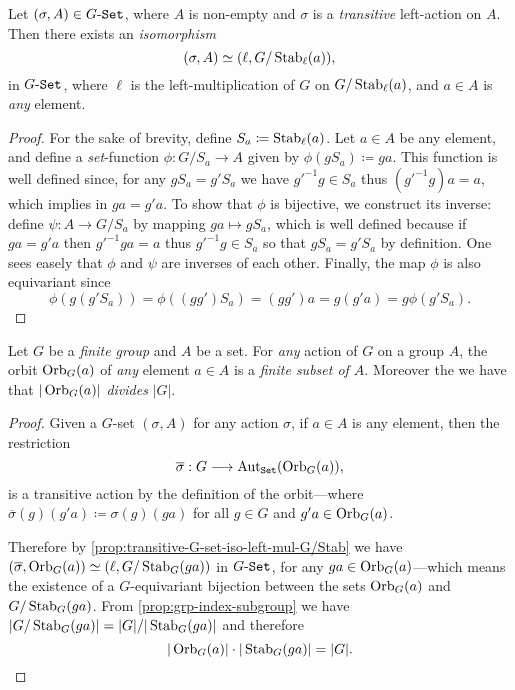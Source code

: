 \begin{proposition}
\label{prop:transitive-G-set-iso-left-mul-G/Stab}
Let \((\sigma, A) \in {{G}\text{-}{\texttt{Set}}}\), where \(A\) is non-empty and \(\sigma\)
is a \emph{transitive} left-action on \(A\). Then there exists an
\emph{isomorphism}
\[
(\sigma, A) \simeq (\ell, G/\operatorname{Stab}_{\ell}(a)),
\]
in \({{G}\text{-}{\texttt{Set}}}\), where \(\ell\) is the left-multiplication of \(G\)
on \(G/\operatorname{Stab}_{\ell}(a)\), and \(a \in A\) is \emph{any} element.
\end{proposition}

\begin{proof}
For the sake of brevity, define \(S_a \coloneq \operatorname{Stab}_{\ell}(a)\). Let
\(a \in A\) be any element, and define a \emph{set}-function
\(\phi: G/S_a \to A\) given by \(\phi(g S_a) \coloneq g a\). This function is
well defined since, for any \(g S_a = g' S_a\) we have \(g'^{-1} g \in S_a\)
thus \((g'^{-1} g) a = a\), which implies in \(g a = g' a\). To show that
\(\phi\) is bijective, we construct its inverse: define \(\psi: A \to G/S_a\) by
mapping \(g a \mapsto g S_a\), which is well defined because if \(g a = g' a\)
then \(g'^{-1} g a = a\) thus \(g'^{-1} g \in S_a\) so that \(g S_a = g' S_a\)
by definition. One sees easely that \(\phi\) and \(\psi\) are inverses of each
other. Finally, the map \(\phi\) is also equivariant since
\[
\phi(g(g' S_a)) = \phi((g g') S_a) = (g g') a = g(g'a) = g \phi(g' S_a).
\]
\end{proof}

\begin{corollary}
\label{cor:orbit-divides-order-of-group}
Let \(G\) be a \emph{finite group} and \(A\) be a set. For \emph{any} action of
\(G\) on a group \(A\), the orbit \(\operatorname{Orb}_G(a)\) of \emph{any} element
\(a \in A\) is a \emph{finite subset of \(A\)}. Moreover the we have that
\(|\operatorname{Orb}_G(a)|\) \emph{divides} \(|G|\).
\end{corollary}

\begin{proof}
Given a \(G\)-set \((\sigma, A)\) for any action \(\sigma\), if \(a \in A\) is
any element, then the restriction
\[
\overline{\sigma}: G \longrightarrow \operatorname{Aut}_{{\texttt{Set}}}(\operatorname{Orb}_G(a)),
\]
is a transitive action by the definition of the orbit---where
\(\overline{\sigma}(g)(g' a) \coloneq \sigma(g)(g a)\) for all \(g \in G\) and
\(g' a \in \operatorname{Orb}_G(a)\).

Therefore by \cref{prop:transitive-G-set-iso-left-mul-G/Stab} we have
\((\overline{\sigma}, \operatorname{Orb}_G(a)) \simeq (\ell, G/\operatorname{Stab}_G(g a))\) in
\({{G}\text{-}{\texttt{Set}}}\), for any \(g a \in \operatorname{Orb}_G(a)\)---which means the existence of a
\(G\)-equivariant bijection between the sets \(\operatorname{Orb}_G(a)\) and
\(G/\operatorname{Stab}_G(g a)\). From \cref{prop:grp-index-subgroup} we have
\(|G/\operatorname{Stab}_G(g a)| = |G|/|\operatorname{Stab}_G(g a)|\) and therefore
\[
|\operatorname{Orb}_G(a)| \cdot |\operatorname{Stab}_G(g a)| = |G|.
\]
\end{proof}

